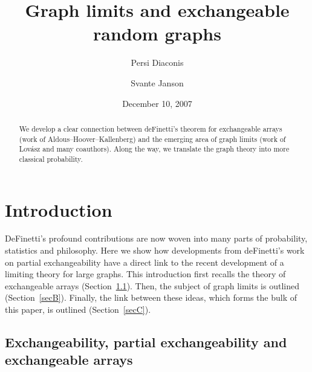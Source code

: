 \documentclass[11pt,reqno,tbtags]{amsart}
\numberwithin{equation}{section}
\theoremstyle{definition}
\theoremstyle{remark}
\newcommand{\refS}[1]{Section~\ref{#1}}
\renewcommand{\=}{:=}
\newcommand\urladdrx[1]{{\urladdr{\def~{{\tiny$\sim$}}#1}}}
\begin{document}
\title%
{Graph limits and exchangeable random graphs}

\date{December 10, 2007} %


\author{Persi Diaconis}
\address{Department of Mathematics,
Stanford University, Stanford California 94305, USA
and  
D\'epartement de Math\'ematiques,
Universit\'e de Nice - Sophia Antipolis,
Parc Valrose,
06108 Nice Cedex 02,
France}



\author{Svante Janson}
\address{Department of Mathematics, Uppsala University, PO Box 480,
SE-751~06 Uppsala, Sweden}
\urladdrx{http://www.math.uu.se/~svante/}




\subjclass[2000]{} 



\begin{abstract} 
We develop a clear connection between deFinetti's theorem for
exchangeable arrays (work of Aldous--Hoover--Kallenberg) and the
emerging area of graph limits (work of Lov\'asz and many
coauthors). Along the way, we translate the graph theory into more
classical probability.
\end{abstract}

\maketitle

\section{Introduction}\label{S:intro}

DeFinetti's profound contributions are now woven into many parts of
probability, statistics and philosophy. Here we show how developments
from deFinetti's work on partial exchangeability have a direct link to
the recent development of a limiting theory for large graphs. This
introduction first recalls the theory of exchangeable arrays
(\refS{secA}). Then, the subject of graph limits is outlined
(\refS{secB}). Finally, the link between these ideas, which forms the
bulk of this paper, is outlined (\refS{secC}).

\subsection{Exchangeability, partial exchangeability and exchangeable
  arrays}\label{secA}
\end{document}
